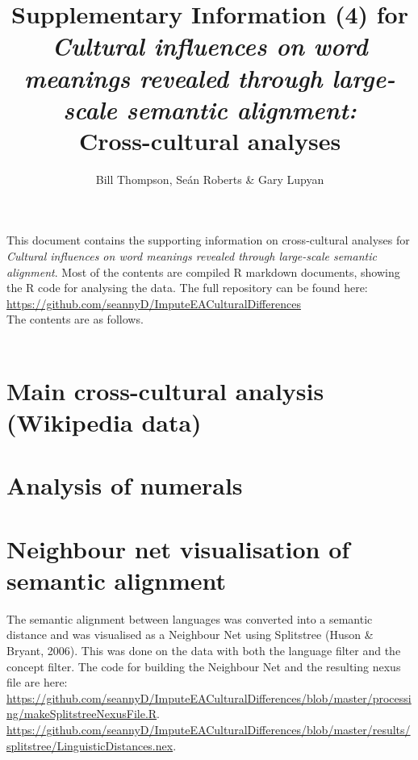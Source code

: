 \documentclass[notitlepage]{report}
\makeatletter
\newcommand*{\toccontents}{\@starttoc{toc}}
\makeatother
\begin{document}
\title{Supplementary Information (4) for \\ \emph{Cultural influences on word meanings revealed through large-scale semantic alignment:}\\Cross-cultural analyses}
\author{Bill Thompson, Se\'{a}n Roberts \& Gary Lupyan}
\date{}
\maketitle

This document contains the supporting information on cross-cultural analyses for \emph{Cultural influences on word meanings revealed through large-scale semantic alignment}.  Most of the contents are compiled R markdown documents, showing the R code for analysing the data. The full repository can be found here:\\
\url{https://github.com/seannyD/ImputeEACulturalDifferences}\\
The contents are as follows.  \\\\
\toccontents

\setcounter{chapter}{4}

\newpage
\section{Main cross-cultural analysis (Wikipedia data)}



\newpage
\section{Analysis of numerals}



\clearpage
\newpage
\section{Neighbour net visualisation of semantic alignment}

The semantic alignment between languages was converted into a semantic distance and was visualised as a Neighbour Net using Splitstree (Huson \& Bryant, 2006). This was done on the data with both the language filter and the concept filter. The code for building the Neighbour Net and the resulting nexus file are here: \\ {\scriptsize \url{https://github.com/seannyD/ImputeEACulturalDifferences/blob/master/processing/makeSplitstreeNexusFile.R}}. \\ {\scriptsize \url{https://github.com/seannyD/ImputeEACulturalDifferences/blob/master/results/splitstree/LinguisticDistances.nex}}.
\end{document}
